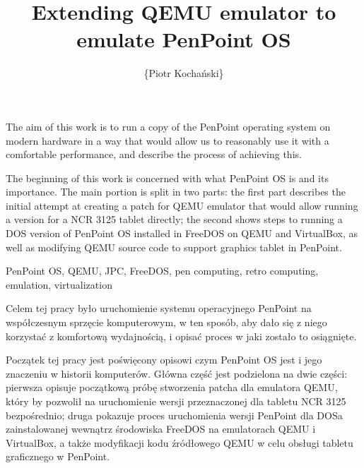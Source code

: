 \documentclass[
    bindingoffset=5mm,  %
    footnoteindent=3mm, %
    hyphenation=true    %
]{src/wut-thesis}
\begin{document}
\title{
    Extending QEMU emulator to emulate PenPoint OS
}

\author{\{Piotr Kochański\}}
\date{\the\year}
\maketitle

\cleardoublepage %

\abstract
The aim of this work is to run a copy of the PenPoint operating system on
modern hardware in a way that would allow us to reasonably use it with
a comfortable performance, and describe the process of achieving this.

The beginning of this work is concerned with what PenPoint OS is and its
importance. The main portion is split in two parts: the first part describes
the initial attempt at creating a patch for QEMU emulator that would allow
running a version for a NCR 3125 tablet directly; the second shows steps to
running a DOS version of PenPoint OS installed in FreeDOS on QEMU and
VirtualBox, as well as modifying QEMU source code to support graphics tablet in
PenPoint.

\keywords
PenPoint OS, QEMU, JPC, FreeDOS, pen computing, retro computing, emulation,
virtualization

\clearpage

\secondabstract
Celem tej pracy było uruchomienie systemu operacyjnego PenPoint na współczesnym
sprzęcie komputerowym, w ten sposób, aby dało się z niego korzystać z komfortową
wydajnością, i opisać proces w jaki zostało to osiągnięte.

Początek tej pracy jest poświęcony opisowi czym PenPoint OS jest i jego znaczeniu
w historii komputerów.  Główna część jest podzielona na dwie części: pierwsza
opisuje początkową próbę stworzenia patcha dla emulatora QEMU, który by pozwolił
na uruchomienie wersji przeznaczonej dla tabletu NCR 3125 bezpośrednio; druga
pokazuje proces uruchomienia wersji PenPoint dla DOSa zainstalowanej wewnątrz
środowiska FreeDOS na emulatorach QEMU i VirtualBox, a także modyfikacji kodu
źródłowego QEMU w celu obsługi tabletu graficznego w PenPoint.
\end{document}
